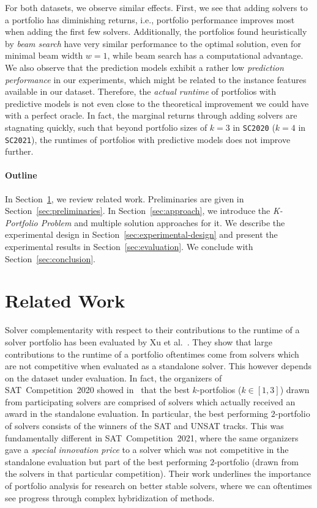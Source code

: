 \documentclass[conference]{IEEEtran}
\begin{document}
For both datasets, we observe similar effects.
First, we see that adding solvers to a portfolio has diminishing returns, i.e., portfolio performance improves most when adding the first few solvers.
Additionally, the portfolios found heuristically by \emph{beam search} have very similar performance to the optimal solution, even for minimal beam width $w=1$, while beam search has a computational advantage.
We also observe that the prediction models exhibit a rather low \emph{prediction performance} in our experiments, which might be related to the instance features available in our dataset.
Therefore, the \emph{actual runtime} of portfolios with predictive models is not even close to the theoretical improvement we could have with a perfect oracle. 
In fact, the marginal returns through adding solvers are stagnating quickly, such that beyond portfolio sizes of $k=3$ in \texttt{SC2020} ($k=4$ in \texttt{SC2021}), the runtimes of portfolios with predictive models does not improve further. 


\paragraph{Outline}

In Section~\ref{sec:related-work}, we review related work. 
Preliminaries are given in Section~\ref{sec:preliminaries}. 
In Section~\ref{sec:approach}, we introduce the \emph{K-Portfolio Problem} and multiple solution approaches for it. 
We describe the experimental design in Section~\ref{sec:experimental-design} and present the experimental results in Section~\ref{sec:evaluation}. 
We conclude with Section~\ref{sec:conclusion}. 

\section{Related Work}
\label{sec:related-work}

Solver complementarity with respect to their contributions to the runtime of a solver portfolio has been evaluated by Xu et al.~\cite{Xu:2012:EvalContribVBS}. 
They show that large contributions to the runtime of a portfolio oftentimes come from solvers which are not competitive when evaluated as a standalone solver. 
This however depends on the dataset under evaluation. 
In fact, the organizers of SAT~Competition~2020 showed in~\cite{SC2020:AIJ} that the best $k$-portfolios ($k \in [1,3]$) drawn from participating solvers are comprised of solvers which actually received an award in the standalone evaluation.
In particular, the best performing $2$-portfolio of solvers consists of the winners of the SAT and UNSAT tracks. 
This was fundamentally different in SAT~Competition~2021, where the same organizers gave a \emph{special innovation price} to a solver which was not competitive in the standalone evaluation but part of the best performing $2$-portfolio (drawn from the solvers in that particular competition).
Their work underlines the importance of portfolio analysis for research on better stable solvers, where we can oftentimes see progress through complex hybridization of methods. 
\end{document}
